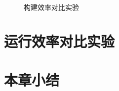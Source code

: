 \begin{figure*}[!ht]
{\begin{threeparttable}[b]
\begin{tabular}{|c|c|c|c|c|c|c|c|}
				
				
			\end{tabular}
			
			
		\end{threeparttable}
	}


\caption{构建效率对比实验}

\label{tbl:logResult}
\end{figure*}


\section{运行效率对比实验}
 \section{本章小结}
